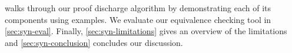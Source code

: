  walks through our proof discharge algorithm by demonstrating each of its
components using examples. We evaluate our equivalence checking tool \toolName{} in \cref{sec:syn-eval}.
Finally, \cref{sec:syn-limitations} gives an overview of the limitations and \cref{sec:syn-conclusion} concludes our discussion.